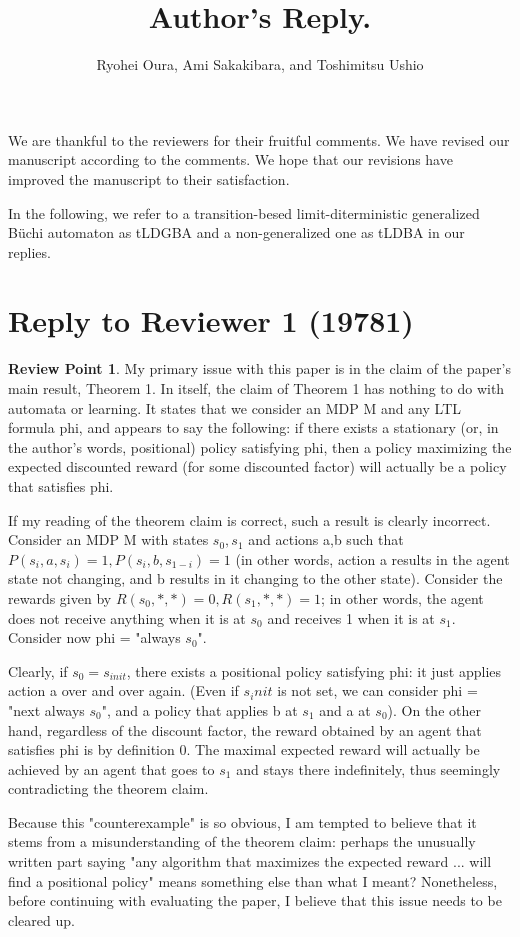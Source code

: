 \documentclass[10 pt, dvipdfmx]{article}
\title{\LARGE \bf
Author's Reply.
}
\author{Ryohei Oura, Ami Sakakibara, and Toshimitsu Ushio}
\theoremstyle{definition}
\newtheorem{review point}{Review Point}[section]
\begin{document}
\maketitle
\thispagestyle{empty}
\pagestyle{empty}

We are thankful to the reviewers for their fruitful comments. We have revised our
manuscript according to the comments. We hope that our revisions have improved
the manuscript to their satisfaction.

In the following, we refer to a transition-besed limit-diterministic generalized B\"{u}chi automaton as tLDGBA and a non-generalized one as tLDBA in our replies.

\section{Reply to Reviewer 1 (19781)}

\begin{review point}
  My primary issue with this paper is in the claim of
the paper's main result, Theorem 1. In itself, the claim of Theorem 1
has nothing to do with automata or learning. It states that we consider
an MDP M and any LTL formula phi, and appears to say the following: if
there exists a stationary (or, in the author's words, positional)
policy satisfying phi, then a policy maximizing the expected discounted
reward (for some discounted factor) will actually be a policy that
satisfies phi.

If my reading of the theorem claim is correct, such a result is clearly
incorrect. Consider an MDP M with states {$s_0,s_1$} and actions {a,b}
such that $P(s_i,a,s_i)=1, P(s_i,b,s_{1-i})=1$ (in other words, action a
results in the agent state not changing, and b results in it changing
to the other state). Consider the rewards given by $R(s_0,*,*)=0,
R(s_1,*,*)=1$; in other words, the agent does not receive anything when
it is at $s_0$ and receives 1 when it is at $s_1$. Consider now phi =
"always $s_0$".

Clearly, if $s_0=s_{init}$, there exists a positional policy satisfying
phi: it just applies action a over and over again. (Even if $s_init$ is
not set, we can consider phi = "next always $s_0$", and a policy that
applies b at $s_1$ and a at $s_0$). On the other hand, regardless of the
discount factor, the reward obtained by an agent that satisfies phi is
by definition 0. The maximal expected reward will actually be achieved
by an agent that goes to $s_1$ and stays there indefinitely, thus
seemingly contradicting the theorem claim.

Because this "counterexample" is so obvious, I am tempted to believe
that it stems from a misunderstanding of the theorem claim: perhaps the
unusually written part saying "any algorithm that maximizes the
expected reward ... will find a positional policy" means something else
than what I meant? Nonetheless, before continuing with evaluating the
paper, I believe that this issue needs to be cleared up.

\end{review point}
\end{document}

